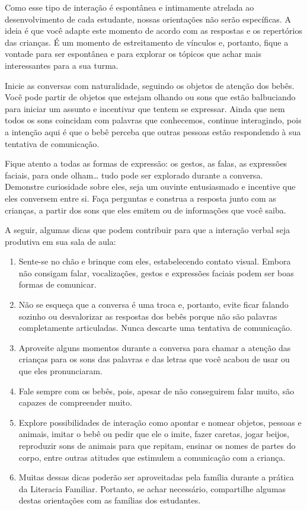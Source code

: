 \documentclass[11pt]{extarticle}
\begin{document}
Como esse tipo de interação é espontânea e intimamente atrelada ao 
desenvolvimento de cada estudante, nossas orientações não serão específicas. 
A ideia é que você adapte este momento de acordo com as respostas e os 
repertórios das crianças. É um momento de estreitamento de vínculos e, portanto, 
fique a vontade para ser espontânea e para explorar os tópicos que achar 
mais interessantes para a sua turma.

Inicie as conversas com naturalidade, seguindo os objetos de atenção dos bebês. 
Você pode partir de objetos que estejam olhando ou sons que estão balbuciando 
para iniciar um assunto e incentivar que tentem se expressar. Ainda que nem 
todos os sons coincidam com palavras que conhecemos, continue interagindo, 
pois a intenção aqui é que o bebê perceba que outras pessoas estão respondendo 
à sua tentativa de comunicação. 

Fique atento a todas as formas de expressão: os gestos, as falas, as 
expressões faciais, para onde olham\ldots{} tudo pode ser explorado durante a conversa. 
Demonstre curiosidade sobre eles, seja um ouvinte entusiasmado e incentive que eles 
conversem entre si. Faça perguntas e construa a resposta junto com as crianças, 
a partir dos sons que eles emitem ou de informações que você saiba. 

A seguir, algumas dicas que podem contribuir para que a interação verbal 
seja produtiva em sua sala de aula: 

\begin{enumerate}
\item Sente-se no chão e brinque com eles, estabelecendo 
contato visual. Embora não consigam falar, vocalizações, 
gestos e expressões faciais podem ser boas formas de comunicar.

\item Não se esqueça que a conversa é uma troca e, portanto, 
evite ficar falando sozinho ou desvalorizar as respostas dos 
bebês porque não são palavras completamente articuladas. 
Nunca descarte uma tentativa de comunicação. 

\item Aproveite alguns momentos durante a conversa para chamar 
a atenção das crianças para os sons das palavras e das letras que você 
acabou de usar ou que eles pronunciaram.  

\item Fale sempre com os bebês, pois, apesar de não conseguirem 
falar muito, são capazes de compreender muito.

\item Explore possibilidades de interação como apontar e 
nomear objetos, pessoas e animais, imitar o bebê ou pedir que 
ele o imite, fazer caretas, jogar beijos, reproduzir sons de 
animais para que repitam, ensinar os nomes de partes do corpo, 
entre outras atitudes que estimulem a comunicação com a criança. 

\item Muitas dessas dicas poderão ser aproveitadas pela 
família durante a prática da Literacia Familiar. Portanto, 
se achar necessário, compartilhe algumas destas orientações 
com as famílias dos estudantes.
\end{enumerate}
\end{document}
